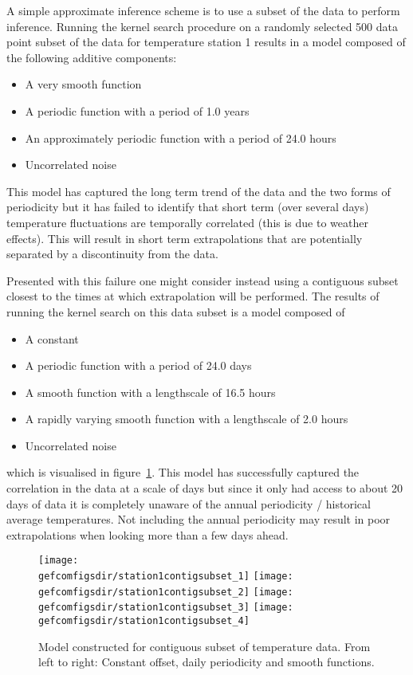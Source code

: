 A simple approximate inference scheme is to use a subset of the data to perform inference\citep[e.g.][]{Quinonero-Candela2005-er}.
Running the kernel search procedure on a randomly selected 500 data point subset of the data for temperature station 1 results in a model composed of the following additive components:
\begin{itemize}
  \item A very smooth function
  \item A periodic function with a period of 1.0 years
  \item An approximately periodic function with a period of 24.0 hours
  \item Uncorrelated noise
\end{itemize}
This model has captured the long term trend of the data and the two forms of periodicity but it has failed to identify that short term (over several days) temperature fluctuations are temporally correlated (this is due to weather effects).
This will result in short term extrapolations that are potentially separated by a discontinuity from the data.

Presented with this failure one might consider instead using a contiguous subset closest to the times at which extrapolation will be performed.
The results of running the kernel search on this data subset is a model composed of
\begin{itemize}
  \item A constant
  \item A periodic function with a period of 24.0 days
  \item A smooth function with a lengthscale of 16.5 hours
  \item A rapidly varying smooth function with a lengthscale of 2.0 hours
  \item Uncorrelated noise
\end{itemize}
which is visualised in figure~\ref{fig:gefcom:contig}.
This model has successfully captured the correlation in the data at a scale of days but since it only had access to about 20 days of data it is completely unaware of the annual periodicity / historical average temperatures.
Not including the annual periodicity may result in poor extrapolations when looking more than a few days ahead.

\begin{figure}[ht]
\centering
\texttt{[image: \\gefcomfigsdir/station1contigsubset\_1]}
\texttt{[image: \\gefcomfigsdir/station1contigsubset\_2]}
\texttt{[image: \\gefcomfigsdir/station1contigsubset\_3]}
\texttt{[image: \\gefcomfigsdir/station1contigsubset\_4]}
\caption[Model constructed for contiguous subset of temperature data]{
Model constructed for contiguous subset of temperature data. From left to right: Constant offset, daily periodicity and smooth functions.
}
\label{fig:gefcom:contig}
\end{figure}

